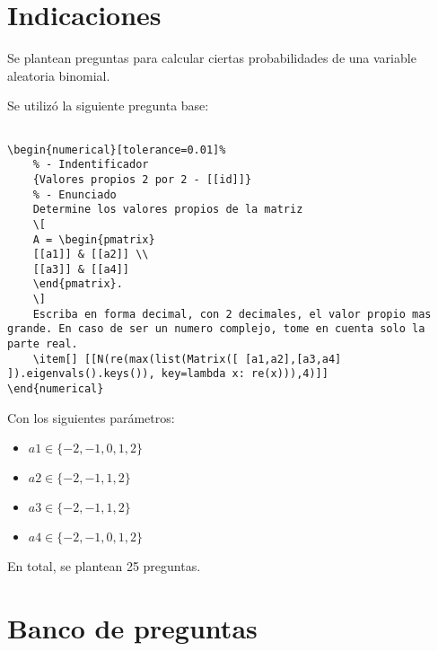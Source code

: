 \documentclass[a4,11pt]{aleph-notas}
\begin{document}
\encabezado

\vspace*{-8mm}
\section{Indicaciones}

Se plantean preguntas para calcular ciertas probabilidades de una variable aleatoria binomial.



Se utilizó la siguiente pregunta base:
\begin{lstlisting}[breaklines]

\begin{numerical}[tolerance=0.01]%
    % - Indentificador
    {Valores propios 2 por 2 - [[id]]}
    % - Enunciado
    Determine los valores propios de la matriz
    \[
    A = \begin{pmatrix}
    [[a1]] & [[a2]] \\
    [[a3]] & [[a4]]
    \end{pmatrix}.
    \]
    Escriba en forma decimal, con 2 decimales, el valor propio mas grande. En caso de ser un numero complejo, tome en cuenta solo la parte real.
    \item[] [[N(re(max(list(Matrix([ [a1,a2],[a3,a4] ]).eigenvals().keys()), key=lambda x: re(x))),4)]]
\end{numerical}

\end{lstlisting}
\noindent
Con los siguientes parámetros:
\begin{itemize}
	\item $a1 \in \{-2, -1, 0, 1, 2\}$
	\item $a2 \in \{-2, -1, 1, 2\}$
	\item $a3 \in \{-2, -1, 1, 2\}$
	\item $a4 \in \{-2, -1, 0, 1, 2\}$

\end{itemize}
En total, se plantean 25 preguntas.


\section{Banco de preguntas}
\end{document}
